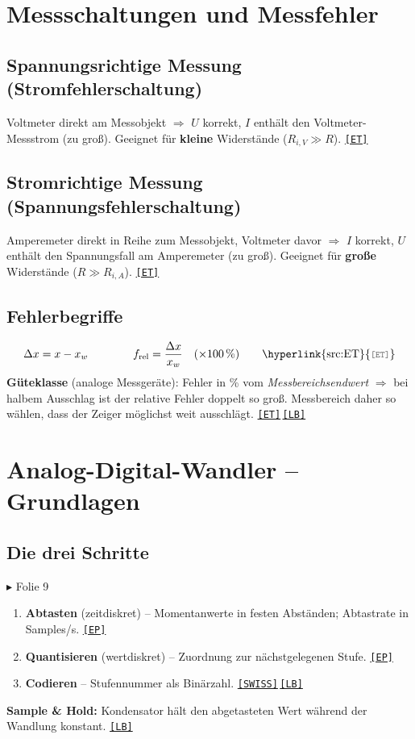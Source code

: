 \documentclass[11pt,a4paper]{article}
\newcommand{\q}[1]{\hyperlink{src:#1}{\textcolor{quelle}{\texttt{\footnotesize[#1]}}}}
\newcommand{\folie}[1]{\textcolor{akzent}{\footnotesize\textsf{$\blacktriangleright$ Folie #1}}}
\begin{document}
\section{Messschaltungen und Messfehler}\label{sec:schaltungen}

\subsection{Spannungsrichtige Messung (Stromfehlerschaltung)}
Voltmeter direkt am Messobjekt $\Rightarrow$ $U$ korrekt, $I$ enthält den Voltmeter-Messstrom (zu groß).
Geeignet für \textbf{kleine} Widerstände ($R_{i,V}\gg R$). \q{ET}

\subsection{Stromrichtige Messung (Spannungsfehlerschaltung)}
Amperemeter direkt in Reihe zum Messobjekt, Voltmeter davor $\Rightarrow$ $I$ korrekt, $U$ enthält den Spannungsfall am Amperemeter (zu groß).
Geeignet für \textbf{große} Widerstände ($R\gg R_{i,A}$). \q{ET}

\subsection{Fehlerbegriffe}\label{sec:fehler}
\begin{equation}\label{f:fehler}
\Delta x = x - x_w \qquad\qquad f_\text{rel}=\frac{\Delta x}{x_w}\quad(\times\SI{100}{\percent})\qquad\text{\q{ET}}
\end{equation}
\textbf{Güteklasse} (analoge Messgeräte): Fehler in \% vom \emph{Messbereichsendwert} $\Rightarrow$ bei halbem Ausschlag ist der relative Fehler doppelt so groß. Messbereich daher so wählen, dass der Zeiger möglichst weit ausschlägt. \q{ET}\,\q{LB}

\section{Analog-Digital-Wandler -- Grundlagen}\label{sec:adc}

\subsection{Die drei Schritte}\label{sec:schritte}
\folie{9}
\begin{enumerate}
  \item \textbf{Abtasten} (zeitdiskret) -- Momentanwerte in festen Abständen; Abtastrate in Samples/s. \q{EP}
  \item \textbf{Quantisieren} (wertdiskret) -- Zuordnung zur nächstgelegenen Stufe. \q{EP}
  \item \textbf{Codieren} -- Stufennummer als Binärzahl. \q{SWISS}\,\q{LB}
\end{enumerate}
\textbf{Sample \& Hold:} Kondensator hält den abgetasteten Wert während der Wandlung konstant. \q{LB}
\end{document}
